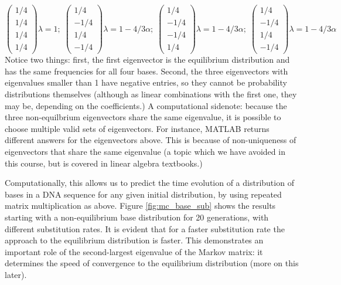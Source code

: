 \documentclass[
  letterpaper,
  DIV=11,
  numbers=noendperiod]{scrreprt}
\begin{document}
\[  
\left(\begin{array}{c} 1/4 \\ 1/4 \\ 1/4 \\ 1/4 \end{array}\right) \lambda =1; \; \left(\begin{array}{c} 1/4 \\ -1/4 \\ 1/4 \\ -1/4 \end{array}\right)\lambda =1-4/3\alpha;  \; \left(\begin{array}{c} 1/4 \\ -1/4 \\ -1/4 \\ 1/4 \end{array}\right)\lambda =1-4/3\alpha;  \; \left(\begin{array}{c} 1/4 \\ -1/4 \\ 1/4 \\ -1/4 \end{array}\right)\lambda =1-4/3\alpha 
\] Notice two things: first, the first eigenvector is the equilibrium
distribution and has the same frequencies for all four bases. Second,
the three eigenvectors with eigenvalues smaller than 1 have negative
entries, so they cannot be probability distributions themselves
(although as linear combinations with the first one, they may be,
depending on the coefficients.) A computational sidenote: because the
three non-equilbrium eigenvectors share the same eigenvalue, it is
possible to choose multiple valid sets of eigenvectors. For instance,
MATLAB returns different answers for the eigenvectors above. This is
because of non-uniqueness of eigenvectors that share the same eigenvalue
(a topic which we have avoided in this course, but is covered in linear
algebra textbooks.)

Computationally, this allows us to predict the time evolution of a
distribution of bases in a DNA sequence for any given initial
distribution, by using repeated matrix multiplication as above. Figure
\ref{fig:mc_base_sub} shows the results starting with a non-equilibrium
base distribution for 20 generations, with different substitution rates.
It is evident that for a faster substitution rate the approach to the
equilibrium distribution is faster. This demonstrates an important role
of the second-largest eigenvalue of the Markov matrix: it determines the
speed of convergence to the equilibrium distribution (more on this
later).
\end{document}
